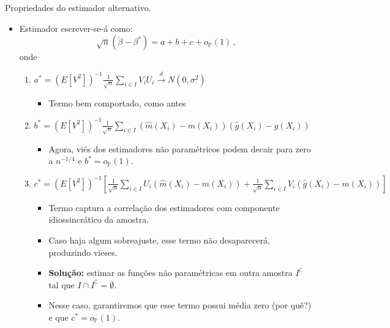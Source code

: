 \documentclass[11pt]{beamer}
\begin{document}
\begin{frame}{Propriedades do estimador alternativo.}
	\begin{itemize}
				\item Estimador escrever-se-á como:
	$$\sqrt{n}(\check{\beta} - \beta^*) =  a+b+c +o_{\mathbb{P}}(1)\, ,$$
	onde 
	\begin{enumerate}
		\item $a^{*}=\left(E\left[V^{2}\right]\right)^{-1} \frac{1}{\sqrt{n}} \sum_{i \in I} V_{i} U_{i} \overset{d}{\to} N(0, \sigma^2)$
		\begin{itemize}
			\item Termo bem comportado, como antes
		\end{itemize}
		\item $b^{*}=\left(E\left[V^{2}\right]\right)^{-1} \frac{1}{\sqrt{n}} \sum_{i \in I}\left(\hat{m}\left(X_{i}\right)-m\left(X_{i}\right)\right)\left(\hat{g}\left(X_{i}\right)-g\left(X_{i}\right)\right)$
		\begin{itemize}
			\item Agora, viés dos estimadores não paramétricos podem decair para zero a $n^{-1/4}$ e $b^* = o_{\mathbb{P}}(1)$.
		\end{itemize}
			\item {\footnotesize$c^{*}=\left(E\left[V^{2}\right]\right)^{-1} \left[\frac{1}{\sqrt{n}} \sum_{i \in I}U_i \left(\hat{m}\left(X_{i}\right)-m\left(X_{i}\right)\right)+ \frac{1}{\sqrt{n}} \sum_{i \in I}V_i\left(\hat{g}\left(X_{i}\right)-m\left(X_{i}\right)\right)\right] $}
			\begin{itemize}
				\item Termo captura a correlação dos estimadores com componente idiossincrático da amostra.
				\item Caso haja algum sobreajuste, esse termo não desaparecerá, produzindo vieses.
				\item \textbf{Solução:} estimar as funções não paramétricas em outra amostra $I^{\complement}$ tal que $I \cap I^{\complement} = \emptyset$.
					\item Nesse caso, garantiremos que esse termo possui média zero (por quê?) e que $c^* = o_{\mathbb{P}}(1)$.
			\end{itemize}
	\end{enumerate}			
\end{itemize}
\end{frame}
\end{document}
